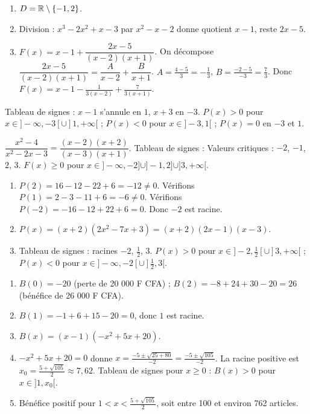 \begin{enumerate}[label=\alph*)]
    \item $D = \mathbb{R} \setminus \{-1, 2\}$.
    \item Division : $x^3 - 2x^2 + x - 3$ par $x^2 - x - 2$ donne quotient $x - 1$, reste $2x - 5$.
    \item $F(x) = x - 1 + \dfrac{2x - 5}{(x-2)(x+1)}$. On décompose $\dfrac{2x-5}{(x-2)(x+1)} = \dfrac{A}{x-2} + \dfrac{B}{x+1}$.
    $A = \frac{4-5}{3} = -\frac{1}{3}$, $B = \frac{-2-5}{-3} = \frac{7}{3}$. Donc $F(x) = x - 1 - \frac{1}{3(x-2)} + \frac{7}{3(x+1)}$.
\end{enumerate}

Tableau de signes : $x-1$ s'annule en $1$, $x+3$ en $-3$.
$P(x) > 0$ pour $x \in ]-\infty, -3[ \cup ]1, +\infty[$ ; $P(x) < 0$ pour $x \in ]-3, 1[$ ; $P(x) = 0$ en $-3$ et $1$.

$\dfrac{x^2 - 4}{x^2 - 2x - 3} = \dfrac{(x-2)(x+2)}{(x-3)(x+1)}$. Tableau de signes :
Valeurs critiques : $-2$, $-1$, $2$, $3$.
$F(x) \geq 0$ pour $x \in ]-\infty, -2] \cup ]-1, 2] \cup ]3, +\infty[$.

\begin{enumerate}[label=\alph*)]
    \item $P(2) = 16 - 12 - 22 + 6 = -12 \neq 0$. Vérifions $P(1) = 2 - 3 - 11 + 6 = -6 \neq 0$. Vérifions $P(-2) = -16 - 12 + 22 + 6 = 0$. Donc $-2$ est racine.
    \item $P(x) = (x+2)(2x^2 - 7x + 3) = (x+2)(2x-1)(x-3)$.
    \item Tableau de signes : racines $-2$, $\frac{1}{2}$, $3$.
    $P(x) > 0$ pour $x \in ]-2, \frac{1}{2}[ \cup ]3, +\infty[$ ; $P(x) < 0$ pour $x \in ]-\infty, -2[ \cup ]\frac{1}{2}, 3[$.
\end{enumerate}

\begin{enumerate}[label=\arabic*)]
    \item $B(0) = -20$ (perte de 20 000 F CFA) ; $B(2) = -8 + 24 + 30 - 20 = 26$ (bénéfice de 26 000 F CFA).
    \item $B(1) = -1 + 6 + 15 - 20 = 0$, donc $1$ est racine.
    \item $B(x) = (x-1)(-x^2 + 5x + 20)$.
    \item $-x^2 + 5x + 20 = 0$ donne $x = \frac{-5 \pm \sqrt{25 + 80}}{-2} = \frac{-5 \pm \sqrt{105}}{-2}$. La racine positive est $x_0 = \frac{5 + \sqrt{105}}{2} \approx 7,62$. Tableau de signes pour $x \geq 0$ : $B(x) > 0$ pour $x \in ]1, x_0[$.
    \item Bénéfice positif pour $1 < x < \frac{5 + \sqrt{105}}{2}$, soit entre 100 et environ 762 articles.
\end{enumerate}

